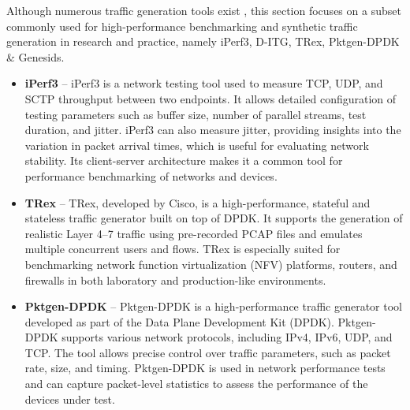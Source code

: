 Although numerous traffic generation tools exist \cite{traffic-generators}, 
this section focuses on a subset commonly used for high-performance benchmarking and synthetic traffic generation in research and practice, namely iPerf3, D-ITG, TRex, Pktgen-DPDK \& Genesids. 

\begin{itemize}
  \item \textbf{iPerf3} -- iPerf3 is a network testing tool used to measure TCP, UDP, and SCTP throughput between two endpoints. It allows detailed configuration of testing parameters such as buffer size, number of parallel streams, test duration, and jitter. iPerf3 can also measure jitter, providing insights into the variation in packet arrival times, which is useful for evaluating network stability. Its client-server architecture makes it a common tool for performance benchmarking of networks and devices.\cite{iperf}

  \item \textbf{TRex} -- TRex, developed by Cisco, is a high-performance, stateful and stateless traffic generator built on top of DPDK. It supports the generation of realistic Layer 4–7 traffic using pre-recorded PCAP files and emulates multiple concurrent users and flows. TRex is especially suited for benchmarking network function virtualization (NFV) platforms, routers, and firewalls in both laboratory and production-like environments.\cite{trex} 

\item \textbf{Pktgen-DPDK} -- Pktgen-DPDK is a high-performance traffic generator tool developed as part of the Data Plane Development Kit (DPDK). Pktgen-DPDK supports various network protocols, including IPv4, IPv6, UDP, and TCP. The tool allows precise control over traffic parameters, such as packet rate, size, and timing. Pktgen-DPDK is used in network performance tests and can capture packet-level statistics to assess the performance of the devices under test.\cite{pktgen_dpdk} 
\end{itemize}



